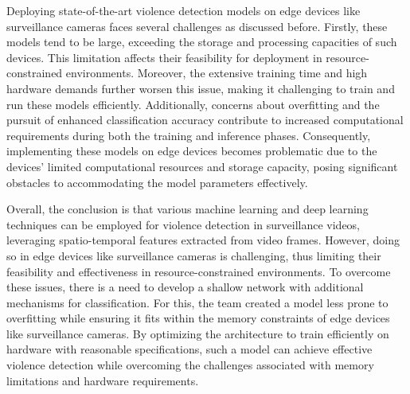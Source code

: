 \noindent Deploying state-of-the-art violence detection models on edge devices like surveillance cameras faces several challenges as discussed before. Firstly, these models tend to be large, exceeding the storage and processing capacities of such devices. This limitation affects their feasibility for deployment in resource-constrained environments. Moreover, the extensive training time and high hardware demands further worsen this issue, making it challenging to train and run these models efficiently. Additionally, concerns about overfitting and the pursuit of enhanced classification accuracy contribute to increased computational requirements during both the training and inference phases. Consequently, implementing these models on edge devices becomes problematic due to the devices' limited computational resources and storage capacity, posing significant obstacles to accommodating the model parameters effectively.

\noindent Overall, the conclusion is that various machine learning and deep learning techniques can be employed for violence detection in surveillance videos, leveraging spatio-temporal features extracted from video frames. However, doing so in edge devices like surveillance cameras is challenging, thus limiting their feasibility and effectiveness in resource-constrained environments. To overcome these issues, there is a need to develop a shallow network with additional mechanisms for classification. For this, the team created a model less prone to overfitting while ensuring it fits within the memory constraints of edge devices like surveillance cameras. By optimizing the architecture to train efficiently on hardware with reasonable specifications, such a model can achieve effective violence detection while overcoming the challenges associated with memory limitations and hardware requirements.

\renewcommand{\footrulewidth}{0.4pt}